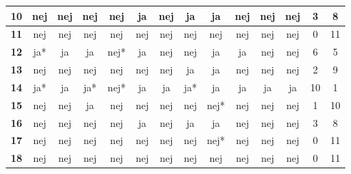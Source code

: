 \begin{table}[H]
\begin{tabular}{l|c|c|c|c|c|c|c|c|c|c|c|c|c}
\cellcolor[HTML]{C0C0C0}\textbf{10}	&nej &nej &nej&	nej	&ja	&nej&	ja&	ja&	nej&	nej&nej & \cellcolor[HTML]{EFEFEF}3 & \cellcolor[HTML]{EFEFEF}8 \\ \hline
\cellcolor[HTML]{C0C0C0}\textbf{11}	 & \cellcolor[HTML]{ECF4FF} nej	& \cellcolor[HTML]{ECF4FF}nej &	\cellcolor[HTML]{ECF4FF}nej &\cellcolor[HTML]{ECF4FF} nej	& \cellcolor[HTML]{ECF4FF}nej &	\cellcolor[HTML]{ECF4FF}nej	& \cellcolor[HTML]{ECF4FF}nej & \cellcolor[HTML]{ECF4FF}nej	& \cellcolor[HTML]{ECF4FF}nej	& \cellcolor[HTML]{ECF4FF}nej	& \cellcolor[HTML]{ECF4FF}nej & \cellcolor[HTML]{EFEFEF}0 & \cellcolor[HTML]{EFEFEF}11\\ \hline 
\cellcolor[HTML]{C0C0C0}\textbf{12}	&ja*&	ja&	ja&	nej*&	ja&	nej&	nej&	ja&	ja&	nej&	nej & \cellcolor[HTML]{EFEFEF}6 & \cellcolor[HTML]{EFEFEF}5 \\ \hline
\cellcolor[HTML]{C0C0C0}\textbf{13}	&nej&	nej&	nej&	nej&	nej&	nej& 	ja&	ja&	nej&	nej&	nej & \cellcolor[HTML]{EFEFEF}2 & \cellcolor[HTML]{EFEFEF}9\\ \hline
\cellcolor[HTML]{C0C0C0}\textbf{14}&ja*&	ja&	ja*&	\cellcolor[HTML]{FFFC9E}nej*&	ja&	ja&	ja*&	ja&	ja&	ja&	ja &\cellcolor[HTML]{EFEFEF}10 &\cellcolor[HTML]{EFEFEF}1
\\ \hline
\cellcolor[HTML]{C0C0C0}\textbf{15}	& nej & nej & \cellcolor[HTML]{FFFC9E}ja & nej & nej & nej &	nej & nej* & nej & nej & nej & \cellcolor[HTML]{EFEFEF}1 & \cellcolor[HTML]{EFEFEF}10 \\ \hline
\cellcolor[HTML]{C0C0C0}\textbf{16}	& nej & nej & nej & nej & ja & nej & ja & ja & nej & nej & nej & \cellcolor[HTML]{EFEFEF}3 & \cellcolor[HTML]{EFEFEF}8 \\ \hline
\cellcolor[HTML]{C0C0C0}\textbf{17} & \cellcolor[HTML]{ECF4FF} nej	& \cellcolor[HTML]{ECF4FF}nej &	\cellcolor[HTML]{ECF4FF}nej &\cellcolor[HTML]{ECF4FF} nej	& \cellcolor[HTML]{ECF4FF}nej &	\cellcolor[HTML]{ECF4FF}nej	& \cellcolor[HTML]{ECF4FF}nej & \cellcolor[HTML]{ECF4FF}nej*	& \cellcolor[HTML]{ECF4FF}nej	& \cellcolor[HTML]{ECF4FF}nej	& \cellcolor[HTML]{ECF4FF}nej & \cellcolor[HTML]{EFEFEF}0 & \cellcolor[HTML]{EFEFEF}11\\ \hline 
\cellcolor[HTML]{C0C0C0}\textbf{18}	 & \cellcolor[HTML]{ECF4FF} nej	& \cellcolor[HTML]{ECF4FF}nej &	\cellcolor[HTML]{ECF4FF}nej &\cellcolor[HTML]{ECF4FF} nej	& \cellcolor[HTML]{ECF4FF}nej &	\cellcolor[HTML]{ECF4FF}nej	& \cellcolor[HTML]{ECF4FF}nej & \cellcolor[HTML]{ECF4FF}nej	& \cellcolor[HTML]{ECF4FF}nej	& \cellcolor[HTML]{ECF4FF}nej	& \cellcolor[HTML]{ECF4FF}nej & \cellcolor[HTML]{EFEFEF}0 & \cellcolor[HTML]{EFEFEF}11\\ \hline 

\end{tabular}
\end{table}
